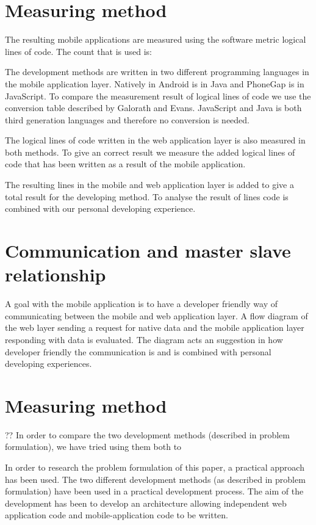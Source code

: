 \section{Measuring method}
The resulting mobile applications are measured using the software metric logical lines of code. The count that is used is:

The development methods are written in two different programming languages in the mobile application layer. Natively in Android is in Java and PhoneGap is in JavaScript. To compare the measurement result of logical lines of code we use the conversion table described by Galorath and Evans\cite[p.~163]{galorath2006}. JavaScript and Java is both third generation languages and therefore no conversion is needed. 

The logical lines of code written in the web application layer is also measured in both methods. To give an correct result we measure the added logical lines of code that has been written as a result of the mobile application. 

The resulting lines in the mobile and web application layer is added to give a total result for the developing method. To analyse the result of lines code is combined with our personal developing experience. 

\section{Communication and master slave relationship}
A goal with the mobile application is to have a developer friendly way of communicating between the mobile and web application layer. A flow diagram of the web layer sending a request for native data and the mobile application layer responding with data is evaluated. The diagram acts an suggestion in how developer friendly the communication is and is combined with personal developing experiences.

\section{Measuring method}
??
In order to compare the two development methods (described in problem formulation), we have tried using them both to 

In order to research the problem formulation of this paper, a practical approach has been used. The two different development methods (as described in problem formulation) have been used in a practical development process. The aim of the development has been to develop an architecture allowing independent web application code and mobile-application code to be written.

